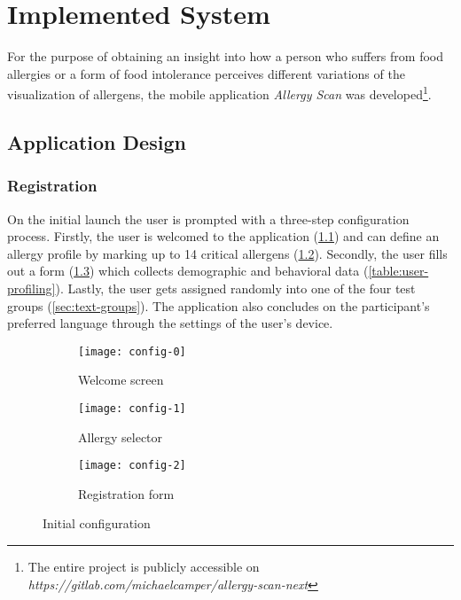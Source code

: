 \chapter{Implemented System}
\thispagestyle{fancy}

For the purpose of obtaining an insight into how a person who suffers from food allergies or a form of food intolerance perceives different variations of the visualization of allergens, the mobile application \emph{Allergy Scan} was developed\footnote{The entire project is publicly accessible on \emph{https://gitlab.com/michaelcamper/allergy-scan-next}}. 

\section{Application Design}

\subsection{Registration}
\label{sub:config}

On the initial launch the user is prompted with a three-step configuration process. Firstly, the user is welcomed to the application (\cref{fig:config-0}) and can define an allergy profile by marking up to 14 critical allergens (\cref{fig:config-1}). Secondly, the user fills out a form (\cref{fig:config-2}) which collects demographic and behavioral data (\cref{table:user-profiling}). Lastly, the user gets assigned randomly into one of the four test groups (\cref{sec:text-groups}). The application also concludes on the participant’s preferred language through the settings of the user’s device. 


\begin{figure}[H]
     \centering
     
     \begin{subfigure}[b]{0.28\textwidth}
         \centering
         \texttt{[image: config-0]}
         \caption{Welcome screen}
         \label{fig:config-0}
     \end{subfigure}
          \hfill
     \begin{subfigure}[b]{0.28\textwidth}
         \centering
         \texttt{[image: config-1]}
         \caption{Allergy selector}
         \label{fig:config-1}
     \end{subfigure}
          \hfill
     \begin{subfigure}[b]{0.28\textwidth}
         \centering
         \texttt{[image: config-2]}
         \caption{Registration form}
         \label{fig:config-2}
     \end{subfigure}
        \caption{Initial configuration}
        \label{fig:config}
\end{figure}

